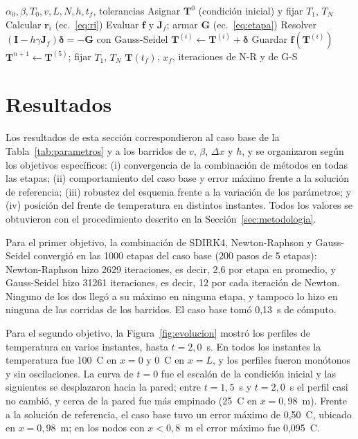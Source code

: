\documentclass[final,5p,times,twocolumn,authoryear,11pt]{elsarticle}
\begin{document}
\begin{algorithm}[H]
\small
\caption{Procedimiento computacional}
\label{alg:procedimiento}
\begin{algorithmic}[1]
\Require $\alpha_0,\beta,T_0,v,L,N,h,t_f$, tolerancias
\State Asignar $\mathbf{T}^{0}$ (condición inicial) y fijar $T_1$, $T_N$
    \State Calcular $\mathbf{r}_i$ (ec.~\ref{eq:ri})
    \Repeat
      \State Evaluar $\mathbf{f}$ y $\mathbf{J}_f$; armar $\mathbf{G}$ (ec.~\ref{eq:etapa})
      \State Resolver $(\mathbf{I}-h\gamma\mathbf{J}_f)\boldsymbol{\delta}=-\mathbf{G}$ con Gauss-Seidel
      \State $\mathbf{T}^{(i)}\leftarrow\mathbf{T}^{(i)}+\boldsymbol{\delta}$
    \State Guardar $\mathbf{f}(\mathbf{T}^{(i)})$
  \EndFor
  \State $\mathbf{T}^{n+1}\leftarrow\mathbf{T}^{(5)}$; fijar $T_1$, $T_N$
\EndFor
\Ensure $\mathbf{T}(t_f)$, $x_f$, iteraciones de N-R y de G-S
\end{algorithmic}
\end{algorithm}

\section{Resultados}
\label{sec:resultados}

Los resultados de esta sección correspondieron al caso base de la Tabla~\ref{tab:parametros} y a los barridos de $v$, $\beta$, $\Delta x$ y $h$, y se organizaron según los objetivos específicos: (i) convergencia de la combinación de métodos en todas las etapas; (ii) comportamiento del caso base y error máximo frente a la solución de referencia; (iii) robustez del esquema frente a la variación de los parámetros; y (iv) posición del frente de temperatura en distintos instantes. Todos los valores se obtuvieron con el procedimiento descrito en la Sección~\ref{sec:metodologia}.

Para el primer objetivo, la combinación de SDIRK4, Newton-Raphson y Gauss-Seidel convergió en las 1000 etapas del caso base (200 pasos de 5 etapas): Newton-Raphson hizo 2629 iteraciones, es decir, 2,6 por etapa en promedio, y Gauss-Seidel hizo 31261 iteraciones, es decir, 12 por cada iteración de Newton. Ninguno de los dos llegó a su máximo en ninguna etapa, y tampoco lo hizo en ninguna de las corridas de los barridos. El caso base tomó 0,13~s de cómputo.

Para el segundo objetivo, la Figura~\ref{fig:evolucion} mostró los perfiles de temperatura en varios instantes, hasta $t=2{,}0$~s. En todos los instantes la temperatura fue 100~\textdegree C en $x=0$ y 0~\textdegree C en $x=L$, y los perfiles fueron monótonos y sin oscilaciones. La curva de $t=0$ fue el escalón de la condición inicial y las siguientes se desplazaron hacia la pared; entre $t=1{,}5$~s y $t=2{,}0$~s el perfil casi no cambió, y cerca de la pared fue más empinado (25~\textdegree C en $x=0{,}98$~m). Frente a la solución de referencia, el caso base tuvo un error máximo de 0,50~\textdegree C, ubicado en $x=0{,}98$~m; en los nodos con $x<0{,}8$~m el error máximo fue 0,095~\textdegree C.
\end{document}
